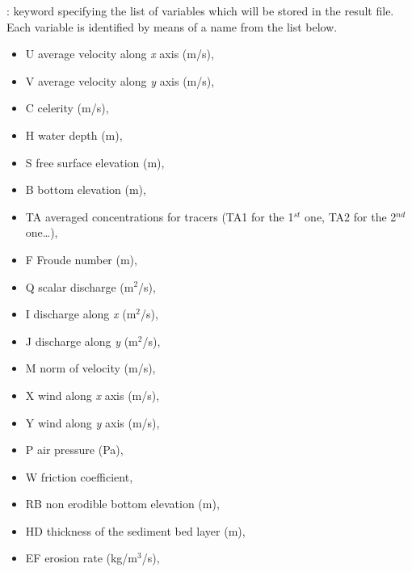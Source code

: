 : keyword specifying the list of
variables which will be stored in the result file. Each variable is identified
by means of a name from the list below.

\begin{itemize}
\item U average velocity along \textit{x} axis (m/s),

\item V average velocity along \textit{y} axis (m/s),

\item C celerity (m/s),

\item H water depth (m),

\item S free surface elevation (m),

\item B bottom elevation (m),

\item TA averaged concentrations for tracers (TA1 for the 1${}^{st}$ one, TA2
for the 2${}^{nd}$ one\dots ),

\item F Froude number (m),

\item Q scalar discharge (m${}^{2}$/s),

\item I discharge along \textit{x} (m${}^{2}$/s),

\item J discharge along \textit{y} (m${}^{2}$/s),

\item M norm of velocity (m/s),

\item X wind along \textit{x} axis (m/s),

\item Y wind along \textit{y} axis (m/s),

\item P air pressure (Pa),

\item W friction coefficient,

\item RB non erodible bottom elevation (m),

\item HD thickness of the sediment bed layer (m),

\item EF erosion rate (kg/m${}^{3}$/s),


\end{itemize}

